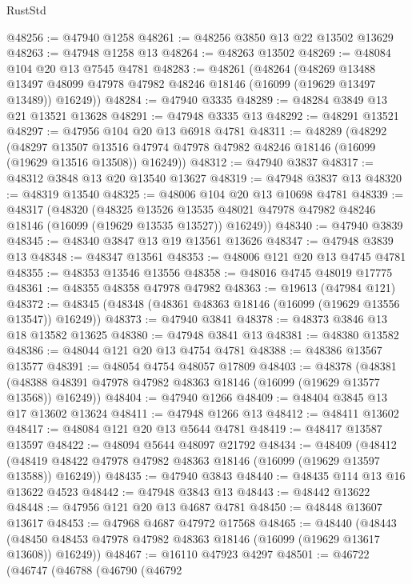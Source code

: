 \begin{lexlean}{RustStd}
\begin{coremodule}
@48256 := @47940 @1258
@48261 := @48256 @3850 @13 @22 @13502 @13629
@48263 := @47948 @1258 @13
@48264 := @48263 @13502
@48269 := @48084 @104 @20 @13 @7545 @4781
@48283 := @48261
    (@48264
      (@48269
        @13488
        @13497
        @48099
        @47978
        @47982
        @48246
        @18146
        (@16099 (@19629 @13497 @13489))
        @16249))
@48284 := @47940 @3335
@48289 := @48284 @3849 @13 @21 @13521 @13628
@48291 := @47948 @3335 @13
@48292 := @48291 @13521
@48297 := @47956 @104 @20 @13 @6918 @4781
@48311 := @48289
    (@48292
      (@48297
        @13507
        @13516
        @47974
        @47978
        @47982
        @48246
        @18146
        (@16099 (@19629 @13516 @13508))
        @16249))
@48312 := @47940 @3837
@48317 := @48312 @3848 @13 @20 @13540 @13627
@48319 := @47948 @3837 @13
@48320 := @48319 @13540
@48325 := @48006 @104 @20 @13 @10698 @4781
@48339 := @48317
    (@48320
      (@48325
        @13526
        @13535
        @48021
        @47978
        @47982
        @48246
        @18146
        (@16099 (@19629 @13535 @13527))
        @16249))
@48340 := @47940 @3839
@48345 := @48340 @3847 @13 @19 @13561 @13626
@48347 := @47948 @3839 @13
@48348 := @48347 @13561
@48353 := @48006 @121 @20 @13 @4745 @4781
@48355 := @48353 @13546 @13556
@48358 := @48016 @4745 @48019 @17775
@48361 := @48355 @48358 @47978 @47982
@48363 := @19613 (@47984 @121)
@48372 := @48345 (@48348 (@48361 @48363 @18146 (@16099 (@19629 @13556 @13547)) @16249))
@48373 := @47940 @3841
@48378 := @48373 @3846 @13 @18 @13582 @13625
@48380 := @47948 @3841 @13
@48381 := @48380 @13582
@48386 := @48044 @121 @20 @13 @4754 @4781
@48388 := @48386 @13567 @13577
@48391 := @48054 @4754 @48057 @17809
@48403 := @48378
    (@48381 (@48388 @48391 @47978 @47982 @48363 @18146 (@16099 (@19629 @13577 @13568)) @16249))
@48404 := @47940 @1266
@48409 := @48404 @3845 @13 @17 @13602 @13624
@48411 := @47948 @1266 @13
@48412 := @48411 @13602
@48417 := @48084 @121 @20 @13 @5644 @4781
@48419 := @48417 @13587 @13597
@48422 := @48094 @5644 @48097 @21792
@48434 := @48409
    (@48412 (@48419 @48422 @47978 @47982 @48363 @18146 (@16099 (@19629 @13597 @13588)) @16249))
@48435 := @47940 @3843
@48440 := @48435 @114 @13 @16 @13622 @4523
@48442 := @47948 @3843 @13
@48443 := @48442 @13622
@48448 := @47956 @121 @20 @13 @4687 @4781
@48450 := @48448 @13607 @13617
@48453 := @47968 @4687 @47972 @17568
@48465 := @48440
    (@48443 (@48450 @48453 @47978 @47982 @48363 @18146 (@16099 (@19629 @13617 @13608)) @16249))
@48467 := @16110 @47923 @4297
@48501 := @46722
    (@46747
      (@46788
        (@46790
          (@46792

\end{coremodule}
\end{lexlean}
